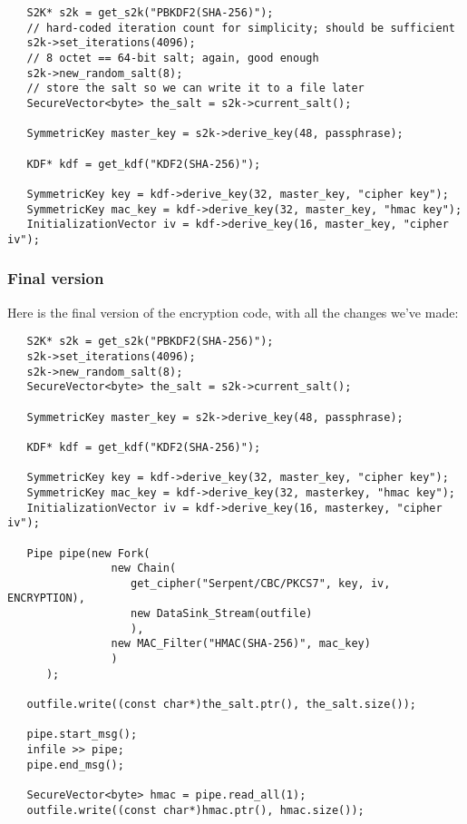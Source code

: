 \documentclass{article}
\begin{document}
\begin{verbatim}
   S2K* s2k = get_s2k("PBKDF2(SHA-256)");
   // hard-coded iteration count for simplicity; should be sufficient
   s2k->set_iterations(4096);
   // 8 octet == 64-bit salt; again, good enough
   s2k->new_random_salt(8);
   // store the salt so we can write it to a file later
   SecureVector<byte> the_salt = s2k->current_salt();

   SymmetricKey master_key = s2k->derive_key(48, passphrase);

   KDF* kdf = get_kdf("KDF2(SHA-256)");

   SymmetricKey key = kdf->derive_key(32, master_key, "cipher key");
   SymmetricKey mac_key = kdf->derive_key(32, master_key, "hmac key");
   InitializationVector iv = kdf->derive_key(16, master_key, "cipher iv");
\end{verbatim}

\subsubsection{Final version}

Here is the final version of the encryption code, with all the changes we've
made:

\begin{verbatim}
   S2K* s2k = get_s2k("PBKDF2(SHA-256)");
   s2k->set_iterations(4096);
   s2k->new_random_salt(8);
   SecureVector<byte> the_salt = s2k->current_salt();

   SymmetricKey master_key = s2k->derive_key(48, passphrase);

   KDF* kdf = get_kdf("KDF2(SHA-256)");

   SymmetricKey key = kdf->derive_key(32, master_key, "cipher key");
   SymmetricKey mac_key = kdf->derive_key(32, masterkey, "hmac key");
   InitializationVector iv = kdf->derive_key(16, masterkey, "cipher iv");

   Pipe pipe(new Fork(
                new Chain(
                   get_cipher("Serpent/CBC/PKCS7", key, iv, ENCRYPTION),
                   new DataSink_Stream(outfile)
                   ),
                new MAC_Filter("HMAC(SHA-256)", mac_key)
                )
      );

   outfile.write((const char*)the_salt.ptr(), the_salt.size());

   pipe.start_msg();
   infile >> pipe;
   pipe.end_msg();

   SecureVector<byte> hmac = pipe.read_all(1);
   outfile.write((const char*)hmac.ptr(), hmac.size());
\end{verbatim}
\end{document}
